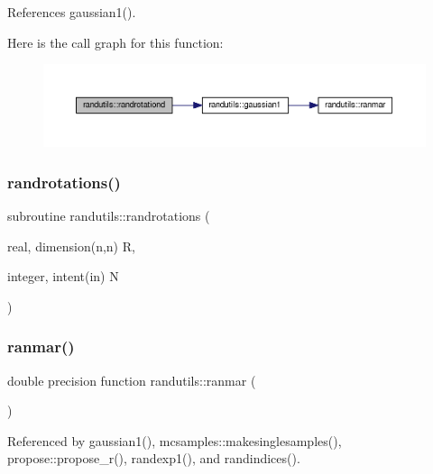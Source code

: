 References gaussian1().

Here is the call graph for this function\+:
\nopagebreak
\begin{figure}[H]
\begin{center}
\leavevmode
\includegraphics[width=350pt]{namespacerandutils_a2231f6417e95a0e41e8f024aaa89445f_cgraph}
\end{center}
\end{figure}
\mbox{\label{namespacerandutils_ad86fd161689210aee49bc794d76ceda5}} 
\subsubsection{\texorpdfstring{randrotations()}{randrotations()}}
{\footnotesize\ttfamily subroutine randutils\+::randrotations (\begin{DoxyParamCaption}\item[{real, dimension(n,n)}]{R,  }\item[{integer, intent(in)}]{N }\end{DoxyParamCaption})}

\mbox{\label{namespacerandutils_a6065ecd619b0a63bceabcecdde031a2c}} 
\subsubsection{\texorpdfstring{ranmar()}{ranmar()}}
{\footnotesize\ttfamily double precision function randutils\+::ranmar (\begin{DoxyParamCaption}{ }\end{DoxyParamCaption})}



Referenced by gaussian1(), mcsamples\+::makesinglesamples(), propose\+::propose\+\_\+r(), randexp1(), and randindices().

